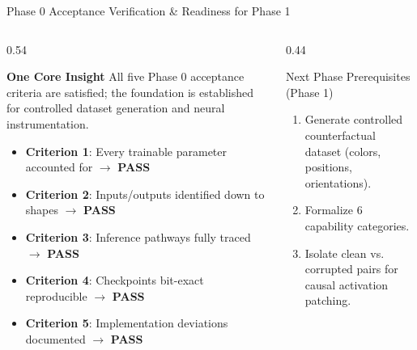 \documentclass[aspectratio=169, 10pt]{beamer}
\begin{document}
\begin{frame}{Phase 0 Acceptance Verification \& Readiness for Phase 1}
  \begin{columns}
    \begin{column}{0.54\textwidth}
      \begin{block}{\textbf{One Core Insight}}
        All five Phase 0 acceptance criteria are satisfied; the foundation is established for controlled dataset generation and neural instrumentation.
      \end{block}
      \vspace{0.3em}
      \begin{itemize}
        \footnotesize
        \item \textbf{Criterion 1}: Every trainable parameter accounted for $\to$ \textbf{PASS}
        \item \textbf{Criterion 2}: Inputs/outputs identified down to shapes $\to$ \textbf{PASS}
        \item \textbf{Criterion 3}: Inference pathways fully traced $\to$ \textbf{PASS}
        \item \textbf{Criterion 4}: Checkpoints bit-exact reproducible $\to$ \textbf{PASS}
        \item \textbf{Criterion 5}: Implementation deviations documented $\to$ \textbf{PASS}
      \end{itemize}
    \end{column}
    \begin{column}{0.44\textwidth}
      \begin{alertblock}{Next Phase Prerequisites (Phase 1)}
        \footnotesize
        \begin{enumerate}
          \item Generate controlled counterfactual dataset (colors, positions, orientations).
          \item Formalize 6 capability categories.
          \item Isolate clean vs. corrupted pairs for causal activation patching.
        \end{enumerate}
      \end{alertblock}
    \end{column}
  \end{columns}
\end{frame}
\end{document}
